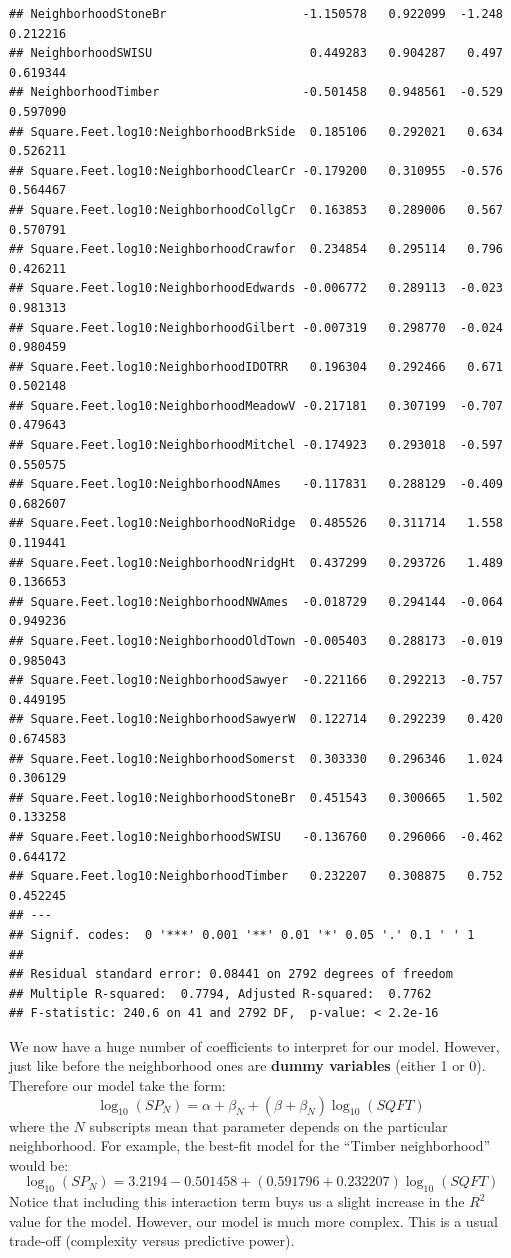 \documentclass[
]{book}
\theoremstyle{definition}
\theoremstyle{definition}
\theoremstyle{definition}
\theoremstyle{definition}
\theoremstyle{remark}
\begin{document}
\begin{verbatim}
## NeighborhoodStoneBr                   -1.150578   0.922099  -1.248 0.212216    
## NeighborhoodSWISU                      0.449283   0.904287   0.497 0.619344    
## NeighborhoodTimber                    -0.501458   0.948561  -0.529 0.597090    
## Square.Feet.log10:NeighborhoodBrkSide  0.185106   0.292021   0.634 0.526211    
## Square.Feet.log10:NeighborhoodClearCr -0.179200   0.310955  -0.576 0.564467    
## Square.Feet.log10:NeighborhoodCollgCr  0.163853   0.289006   0.567 0.570791    
## Square.Feet.log10:NeighborhoodCrawfor  0.234854   0.295114   0.796 0.426211    
## Square.Feet.log10:NeighborhoodEdwards -0.006772   0.289113  -0.023 0.981313    
## Square.Feet.log10:NeighborhoodGilbert -0.007319   0.298770  -0.024 0.980459    
## Square.Feet.log10:NeighborhoodIDOTRR   0.196304   0.292466   0.671 0.502148    
## Square.Feet.log10:NeighborhoodMeadowV -0.217181   0.307199  -0.707 0.479643    
## Square.Feet.log10:NeighborhoodMitchel -0.174923   0.293018  -0.597 0.550575    
## Square.Feet.log10:NeighborhoodNAmes   -0.117831   0.288129  -0.409 0.682607    
## Square.Feet.log10:NeighborhoodNoRidge  0.485526   0.311714   1.558 0.119441    
## Square.Feet.log10:NeighborhoodNridgHt  0.437299   0.293726   1.489 0.136653    
## Square.Feet.log10:NeighborhoodNWAmes  -0.018729   0.294144  -0.064 0.949236    
## Square.Feet.log10:NeighborhoodOldTown -0.005403   0.288173  -0.019 0.985043    
## Square.Feet.log10:NeighborhoodSawyer  -0.221166   0.292213  -0.757 0.449195    
## Square.Feet.log10:NeighborhoodSawyerW  0.122714   0.292239   0.420 0.674583    
## Square.Feet.log10:NeighborhoodSomerst  0.303330   0.296346   1.024 0.306129    
## Square.Feet.log10:NeighborhoodStoneBr  0.451543   0.300665   1.502 0.133258    
## Square.Feet.log10:NeighborhoodSWISU   -0.136760   0.296066  -0.462 0.644172    
## Square.Feet.log10:NeighborhoodTimber   0.232207   0.308875   0.752 0.452245    
## ---
## Signif. codes:  0 '***' 0.001 '**' 0.01 '*' 0.05 '.' 0.1 ' ' 1
## 
## Residual standard error: 0.08441 on 2792 degrees of freedom
## Multiple R-squared:  0.7794, Adjusted R-squared:  0.7762 
## F-statistic: 240.6 on 41 and 2792 DF,  p-value: < 2.2e-16
\end{verbatim}

We now have a huge number of coefficients to interpret for our model. However, just like before the neighborhood ones are \textbf{dummy variables} (either 1 or 0). Therefore our model take the form:
\[ \log_{10}(SP_N)=\alpha+\beta_N+(\beta+\beta_N)\log_{10}(SQFT)\]
where the \(N\) subscripts mean that parameter depends on the particular neighborhood. For example, the best-fit model for the ``Timber neighborhood'' would be:
\[ \log_{10}(SP_N)=3.2194-0.501458+(0.591796+0.232207)\log_{10}(SQFT)\]
Notice that including this interaction term buys us a slight increase in the \(R^2\) value for the model. However, our model is much more complex. This is a usual trade-off (complexity versus predictive power).
\end{document}
